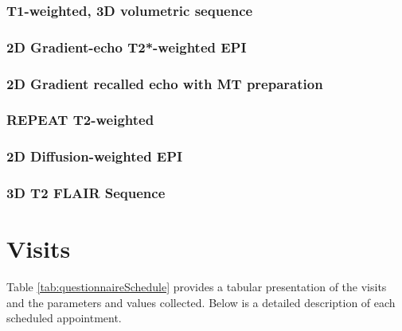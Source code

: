 \subsubsection{T1-weighted, 3D volumetric sequence}


\subsubsection{2D Gradient-echo T2*-weighted EPI}



\subsubsection{2D Gradient recalled echo with MT preparation}


\subsubsection{REPEAT T2-weighted}


\subsubsection{2D Diffusion-weighted EPI}


\subsubsection{3D T2 \ac{FLAIR} Sequence}



\section{Visits}
Table \ref{tab:questionnaireSchedule} provides a tabular presentation of the visits and the parameters and values collected. Below is a detailed description of each scheduled appointment.



